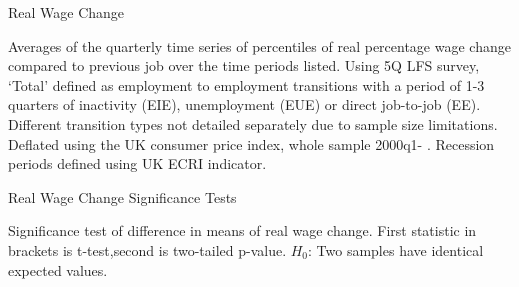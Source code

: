\documentclass[11pt, oneside]{article}
\begin{document}
	
	\begin{table}[h] 
		\caption{Real Wage Change}
		\begin{adjustbox}{max width=16cm, max height=11cm}
			\begin{threeparttable}
				
				\begin{tablenotes}
					\item Averages of the quarterly time series of percentiles of real percentage wage change compared to previous job over the time periods listed. Using 5Q LFS survey, `Total' defined as employment to employment transitions with a period of 1-3 quarters of inactivity (EIE), unemployment (EUE) or direct job-to-job (EE). Different transition types not detailed separately due to sample size limitations. Deflated using the UK consumer price index, whole sample 2000q1- \hspace{-1mm}. Recession periods defined using UK ECRI indicator.
				\end{tablenotes}
			\end{threeparttable}
		\end{adjustbox}
		\label{tab:RealWageChange}
	\end{table}

	
	\begin{table}[H] 
		\caption{Real Wage Change Significance Tests}
		\begin{adjustbox}{max width=16cm, max height=11cm}
			\begin{threeparttable}
				
				
				\begin{tablenotes}
					\item Significance test of difference in means of real wage change. First statistic in brackets is t-test,second is two-tailed p-value. $H_0$: Two samples have identical expected values.
				\end{tablenotes}
			\end{threeparttable}
		\end{adjustbox}
		\label{tab:wages_ttest}	
	\end{table}
	
\end{document}
